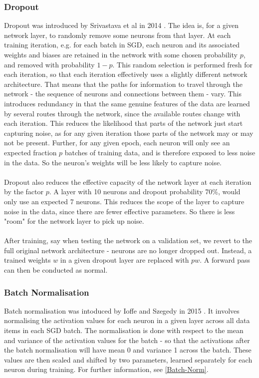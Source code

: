 \documentclass[11pt]{article} %
\theoremstyle{plain}
\theoremstyle{definition}
\begin{document}
\subsubsection{Dropout}
Dropout was introduced by Srivastava et al in 2014 \cite{dropout_paper}. The idea is, for a given network layer, to randomly remove some neurons from that layer. At each training iteration, e.g. for each batch in SGD, each neuron and its associated weights and biases are retained in the network with some chosen probability \(p\), and removed with probability \(1-p\). This random selection is performed fresh for each iteration, so that each iteration effectively uses a slightly different network architecture. That means that the paths for information to travel through the network - the sequence of neurons and connections between them - vary. This introduces redundancy in that the same genuine features of the data are learned by several routes through the network, since the available routes change with each iteration. This reduces the likelihood that parts of the network just start capturing noise, as for any given iteration those parts of the network may or may not be present. Further, for any given epoch, each neuron will only see an expected fraction \(p\) batches of training data, and is therefore exposed to less noise in the data. So the neuron's weights will be less likely to capture noise.        
\\
\\
\noindent
Dropout also reduces the effective capacity of the network layer at each iteration by the factor \(p\). A layer with 10 neurons and dropout probability 70\%, would only use an expected 7 neurons. This reduces the scope of the layer to capture noise in the data, since there are fewer effective parameters. So there is less "room" for the network layer to pick up noise.
\\
\\
\noindent
After training, say when testing the network on a validation set, we revert to the full original network architecture - neurons are no longer dropped out. Instead, a trained weights \(w\) in a given dropout layer are replaced with \(pw\). A forward pass can then be conducted as normal. 

\subsubsection{Batch Normalisation}
Batch normalisation was intoduced by Ioffe and Szegedy in 2015 \cite{BatchNorm_Paper}. It involves normalising the activation values for each neuron in a given layer across all data items in each SGD batch. The normalisation is done with respect to the mean and variance of the activation values for the batch - so that the activations after the batch normalisation will have mean 0 and variance 1 across the batch. These values are then scaled and shifted by two parameters, learned separately for each neuron during training. For further information, see \ref{Batch-Norm}.
 
\end{document}
